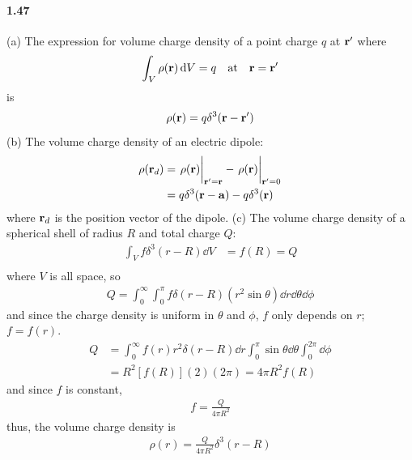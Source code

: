 \documentclass[../main.tex]{subfiles}
\begin{document}
\paragraph{1.47}
(a) The expression for volume charge density of a point charge $q$ at $\vb{r}'$ where
\begin{align*}
    \int_V \rho(\vb{r}) \dd{V} = q \qq{at} \vb{r} = \vb{r}'
\end{align*}
is 
\begin{align*}
    \rho(\vb{r}) = q \delta^3(\vb{r} - \vb{r}')
\end{align*}
(b) The volume charge density of an electric dipole:
\begin{align*}
    \rho(\vb{r}_d) &= \eval{\rho(\vb{r})}_{\vb{r}' = \vb{r}} - \eval{\rho(\vb{r})}_{\vb{r}' = 0} \\
    &= q \delta^3(\vb{r} - \vb{a}) - q \delta^3(\vb{r})
\end{align*}
where $\vb{r}_d$ is the position vector of the dipole.
(c) The volume charge density of a spherical shell of radius $R$ and total charge $Q$:
\begin{align*}
    \int_V f \delta^3(r - R) \dd{V} &= f(R) = Q \\
\end{align*}
where $V$ is all space, so
\begin{align*}
    Q = \int_0^{\infty}  \int_0^{\pi} f \delta(r - R) 
        (r^2 \sin\theta)\dd{r} \dd{\theta} \dd{\phi} %
\end{align*}
and since the charge density is uniform in $\theta$ and $\phi$, $f$ only depends on $r$; $f = f(r)$.
\begin{align*}
    Q &=  \int_0^{\infty} f(r) r^2 \delta(r - R) \dd{r} \int_0^{\pi} \sin\theta \dd{\theta}
        \int_0^{2\pi} \dd{\phi} \\
    &= R^2 [f(R)] (2) (2\pi) = 4\pi R^2 f(R)
\end{align*}
and since $f$ is constant,
\begin{align*}
    f = \frac{Q}{4\pi R^2}
\end{align*}
thus, the volume charge density is
\begin{align*}
    \rho(r) = \frac{Q}{4\pi R^2} \delta^3(r - R)
\end{align*}
\end{document}
